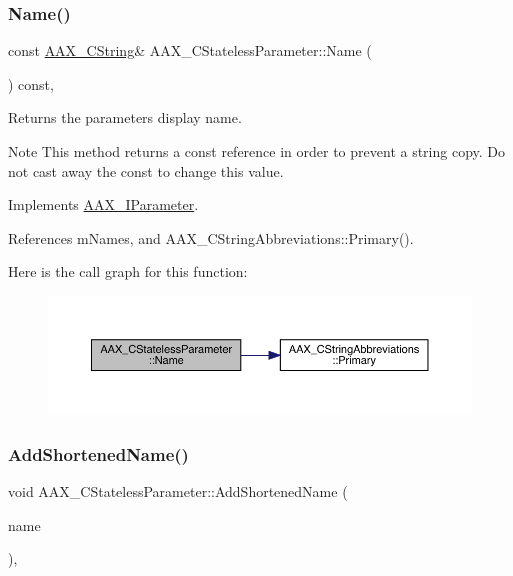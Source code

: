 \subsubsection{\texorpdfstring{Name()}{Name()}}
{\footnotesize\ttfamily const \mbox{\hyperlink{a01573}{A\+A\+X\+\_\+\+C\+String}}\& A\+A\+X\+\_\+\+C\+Stateless\+Parameter\+::\+Name (\begin{DoxyParamCaption}{ }\end{DoxyParamCaption}) const\hspace{0.3cm}{\ttfamily [inline]}, {\ttfamily [virtual]}}



Returns the parameter\textquotesingle{}s display name. 

\begin{DoxyNote}{Note}
This method returns a const reference in order to prevent a string copy. Do not cast away the const to change this value. 
\end{DoxyNote}


Implements \mbox{\hyperlink{a01857_ae1dae8844a16492726cb6caac7e2e822}{A\+A\+X\+\_\+\+I\+Parameter}}.



References m\+Names, and A\+A\+X\+\_\+\+C\+String\+Abbreviations\+::\+Primary().

Here is the call graph for this function\+:
\nopagebreak
\begin{figure}[H]
\begin{center}
\leavevmode
\includegraphics[width=350pt]{a01541_a191fc266252f440feca3f3138e706cb8_cgraph}
\end{center}
\end{figure}
\mbox{\label{a01541_a332e391a496d741f0f86ee7e46dbe6a4}} 
\subsubsection{\texorpdfstring{AddShortenedName()}{AddShortenedName()}}
{\footnotesize\ttfamily void A\+A\+X\+\_\+\+C\+Stateless\+Parameter\+::\+Add\+Shortened\+Name (\begin{DoxyParamCaption}\item[{const \mbox{\hyperlink{a01573}{A\+A\+X\+\_\+\+C\+String}} \&}]{name }\end{DoxyParamCaption})\hspace{0.3cm}{\ttfamily [inline]}, {\ttfamily [virtual]}}



